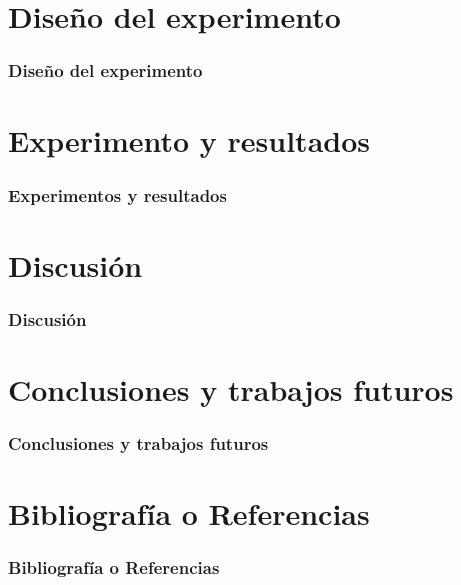 \documentclass{beamer}
\begin{document}
\section{Diseño del experimento}
\begin{frame}
\frametitle{Diseño del experimento}
\end{frame}
\section{Experimento y resultados}
\begin{frame}
\frametitle{Experimentos y resultados}
\end{frame}
\section{Discusi{\'o}n}
\begin{frame}
\frametitle{Discusi{\'o}n}
\end{frame}
\section{Conclusiones y trabajos futuros}
\begin{frame}
\frametitle{Conclusiones y trabajos futuros}
\end{frame}
\section{Bibliograf{\'i}a o Referencias}
\begin{frame}
\frametitle{Bibliograf{\'i}a o Referencias}
\end{frame}
\end{document}
